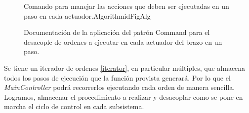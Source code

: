\begin{figure}[h]
\caption{Documentación de la aplicación del patrón Command para el desacople de ordenes a ejecutar en cada actuador del brazo en un paso.}
\label{docCommandSteps}
\begin{pattern}[]{Comando para manejar las acciones que deben ser ejecutadas en un paso en cada actuador.}{Algorithm}{idFigAlg}
\assigns
{}

\end{pattern}
\end{figure}


Se tiene un iterador de ordenes \ref{iterator}, en particular múltiples, que almacena todos los pasos de ejecución que la función provista generará. Por lo que el \textit{MainController} podrá recorrerlos ejecutando cada orden de manera sencilla. Logramos, almacenar el procedimiento a realizar y desacoplar como se pone en marcha el ciclo de control en cada subsistema.


